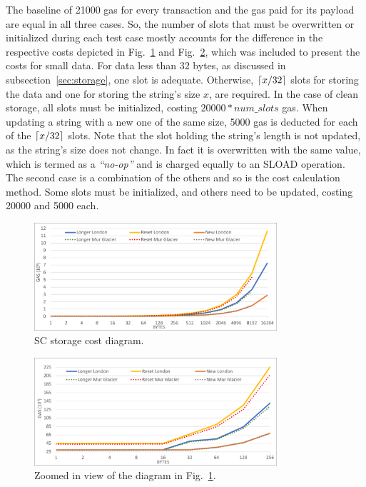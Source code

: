 The baseline of 21000 gas for every transaction and the gas paid for its payload are equal in all three cases. So, the number of slots that must be overwritten or initialized during each test case mostly accounts for the difference in the respective costs depicted in Fig.~\ref{fig:store1} and Fig.~\ref{fig:store2}, which was included to present the costs for small data. For data less than 32 bytes, as discussed in subsection~\ref{sec:storage}, one slot is adequate. Otherwise, \(\ceil*{x/32}\) slots for storing the data and one for storing the string's size \(x\), are required. In the case of clean storage, all slots must be initialized, costing \(20000*num\_slots\) gas. When updating a string with a new one of the same size, 5000 gas is deducted for each of the \(\ceil*{x/32}\) slots. Note that the slot holding the string’s length is not updated, as the string’s size does not change. In fact it is overwritten with the same value, which is termed as a \emph{``no-op''} and is charged equally to an SLOAD operation. The second case is a combination of the others and so is the cost calculation method. Some slots must be initialized, and others need to be updated, costing 20000 and 5000 each.

\begin{figure}[htbp]
\centerline{\includegraphics[width=9cm]{figs/store1.pdf}}
\caption{SC storage cost diagram.}
\label{fig:store1}
\end{figure}

\begin{figure}[htbp]
\centerline{\includegraphics[width=9cm]{figs/store2.pdf}}
\caption{Zoomed in view of the diagram in Fig.~\ref{fig:store1}.}
\label{fig:store2}
\end{figure}

